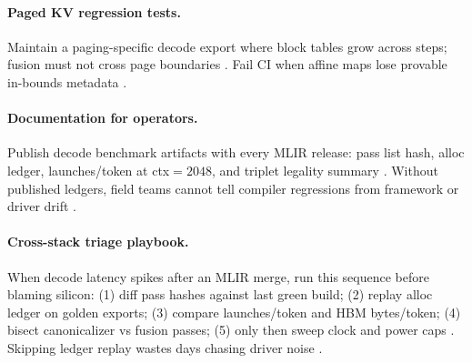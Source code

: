\paragraph{Paged KV regression tests.} Maintain a paging-specific decode export where block tables grow across steps; fusion must not cross page boundaries \citep{kwon2023vllm,dao2022flashattention,yirage2026,memoryfloor2026,chen2020compilerbasedhardw,taxbreak2026,patel2025llminference,liu2024deepseekv3,amd2024aie,amd2024xdna,dao2022flashattention,dao2023flashdecoding,nvidia2024cudagraphs,nvidia2022hopper,semianalysis2024tma,dlbook}. Fail CI when affine maps lose provable in-bounds metadata \citep{yirage2026,kwon2023vllm,chen2020compilerbasedhardw,memoryfloor2026,taxbreak2026,patel2025llminference,liu2024deepseekv3,amd2024aie,amd2024xdna,dao2022flashattention,dao2023flashdecoding,nvidia2024cudagraphs,nvidia2022hopper,semianalysis2024tma,dlbook}.

\paragraph{Documentation for operators.} Publish decode benchmark artifacts with every MLIR release: pass list hash, alloc ledger, launches/token at ctx${=}2048$, and triplet legality summary \citep{patel2025llminference,yirage2026,chen2020compilerbasedhardw,memoryfloor2026,taxbreak2026,kwon2023vllm,liu2024deepseekv3,amd2024aie,amd2024xdna,dao2022flashattention,dao2023flashdecoding,nvidia2024cudagraphs,nvidia2022hopper,semianalysis2024tma,dlbook}. Without published ledgers, field teams cannot tell compiler regressions from framework or driver drift \citep{yirage2026,patel2025llminference,memoryfloor2026,taxbreak2026,chen2020compilerbasedhardw,kwon2023vllm,liu2024deepseekv3,amd2024aie,amd2024xdna,dao2022flashattention,dao2023flashdecoding,nvidia2024cudagraphs,nvidia2022hopper,semianalysis2024tma,dlbook}.


\paragraph{Cross-stack triage playbook.} When decode latency spikes after an MLIR merge, run this sequence before blaming silicon: (1) diff pass hashes against last green build; (2) replay alloc ledger on golden exports; (3) compare launches/token and HBM bytes/token; (4) bisect canonicalizer vs fusion passes; (5) only then sweep clock and power caps \citep{yirage2026,chen2020compilerbasedhardw,patel2025llminference,memoryfloor2026,taxbreak2026,kwon2023vllm,liu2024deepseekv3,amd2024aie,amd2024xdna,dao2022flashattention,dao2023flashdecoding,nvidia2024cudagraphs,nvidia2022hopper,semianalysis2024tma,dlbook}. Skipping ledger replay wastes days chasing driver noise \citep{memoryfloor2026,taxbreak2026,yirage2026,chen2020compilerbasedhardw,patel2025llminference,kwon2023vllm,liu2024deepseekv3,amd2024aie,amd2024xdna,dao2022flashattention,dao2023flashdecoding,nvidia2024cudagraphs,nvidia2022hopper,semianalysis2024tma,dlbook}.

